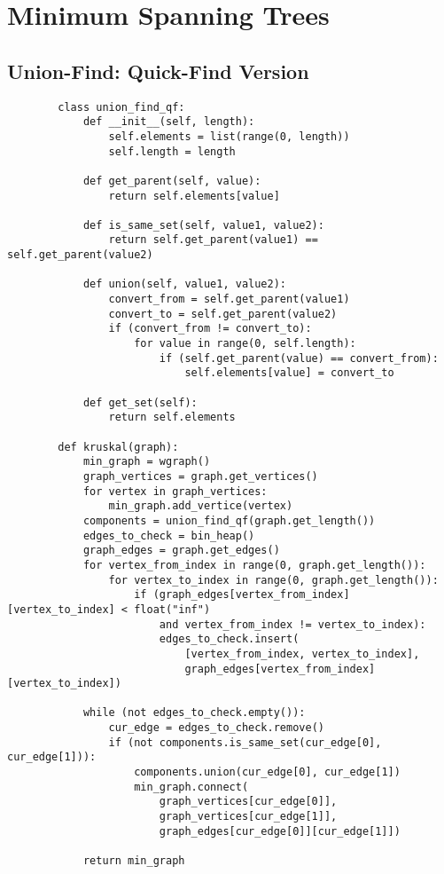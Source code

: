 \newpage

\section[Day 8: Minimum Spanning Trees]{ Minimum Spanning Trees }

\subsection{ Union-Find: Quick-Find Version }

    \begin{lstlisting}
        class union_find_qf:
            def __init__(self, length):
                self.elements = list(range(0, length))
                self.length = length

            def get_parent(self, value):
                return self.elements[value]
            
            def is_same_set(self, value1, value2):
                return self.get_parent(value1) == self.get_parent(value2)
            
            def union(self, value1, value2):
                convert_from = self.get_parent(value1)
                convert_to = self.get_parent(value2)
                if (convert_from != convert_to):
                    for value in range(0, self.length):
                        if (self.get_parent(value) == convert_from):
                            self.elements[value] = convert_to

            def get_set(self):
                return self.elements

        def kruskal(graph):
            min_graph = wgraph()
            graph_vertices = graph.get_vertices()
            for vertex in graph_vertices:
                min_graph.add_vertice(vertex)
            components = union_find_qf(graph.get_length())
            edges_to_check = bin_heap()
            graph_edges = graph.get_edges()
            for vertex_from_index in range(0, graph.get_length()):
                for vertex_to_index in range(0, graph.get_length()):
                    if (graph_edges[vertex_from_index][vertex_to_index] < float("inf")
                        and vertex_from_index != vertex_to_index):
                        edges_to_check.insert(
                            [vertex_from_index, vertex_to_index],
                            graph_edges[vertex_from_index][vertex_to_index])
            
            while (not edges_to_check.empty()):
                cur_edge = edges_to_check.remove()
                if (not components.is_same_set(cur_edge[0], cur_edge[1])):
                    components.union(cur_edge[0], cur_edge[1])
                    min_graph.connect(
                        graph_vertices[cur_edge[0]],
                        graph_vertices[cur_edge[1]],
                        graph_edges[cur_edge[0]][cur_edge[1]])
            
            return min_graph
    \end{lstlisting}


